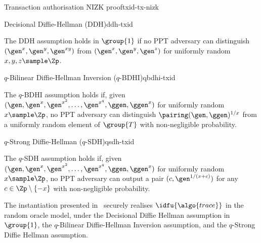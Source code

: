 \begin{protocolbox}{Transaction authorisation NIZK proof}{txid-tx-nizk}
\begin{description}
\begin{enumerate}
        \end{enumerate}

    \end{description}

  \end{protocolbox}

  \begin{assumptionbox}{Decisional Diffie-Hellman (DDH)}{ddh-txid}

    The DDH assumption holds in $\group{1}$ if no PPT adversary can distinguish
    $(\gen^x, \gen^y, \gen^{xy})$ from $(\gen^x, \gen^y, \gen^z)$ for uniformly
    random $x, y, z \sample \Zp$.

  \end{assumptionbox}

  \begin{assumptionbox}{$q$-Bilinear Diffie-Hellman Inversion
    ($q$-BDHI)}{qbdhi-txid}

    The $q$-BDHI assumption holds if, given $(\gen, \gen^{x}, \gen^{x^2},
    \dots, \gen^{x^q}, \ggen, \ggen^{x})$ for uniformly random $x \sample \Zp$,
    no PPT adversary can distinguish $\pairing(\gen,\ggen)^{1/x}$ from a
    uniformly random element of $\group{T}$ with non-negligible probability.

  \end{assumptionbox}

  \begin{assumptionbox}{$q$-Strong Diffie-Hellman ($q$-SDH)}{qsdh-txid}

    The $q$-SDH assumption holds if, given $(\gen, \gen^{x}, \gen^{x^2}, \dots,
    \gen^{x^q}, \ggen, \ggen^{x})$ for uniformly random $x \sample \Zp$, no PPT
    adversary can output a pair $(c, \gen^{1/(x+c)})$ for any $c \in \Zp
    \setminus \{-x\}$ with non-negligible probability.

  \end{assumptionbox}

  \begin{theorem}\label{thm:inst} The instantiation presented
    in~ securely realises $\idfu{\algo{trace}}$ in the
    random oracle model, under the Decisional Diffie Hellman assumption in
    $\group{1}$, the $q$-Bilinear Diffie-Hellman Inversion assumption, and the
    $q$-Strong Diffie Hellman assumption.  \end{theorem}
